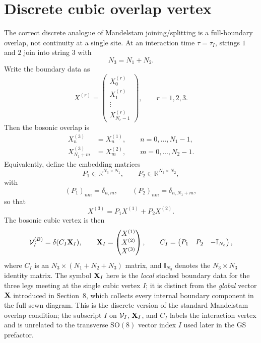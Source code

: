 \documentclass[11pt]{article}
\numberwithin{equation}{section}
\newcommand{\RR}{\mathbb{R}}
\begin{document}
\section{Discrete cubic overlap vertex}
The correct discrete analogue of Mandelstam joining/splitting is a full-boundary overlap, not continuity at a single site. At an interaction time $\tau=\tau_I$, strings $1$ and $2$ join into string $3$ with
\begin{equation}
\label{eq:s9-001}
N_3=N_1+N_2.
\end{equation}
Write the boundary data as
\begin{equation}
\label{eq:s9-002}
X^{(r)}=
\begin{pmatrix}
X^{(r)}_0\\
X^{(r)}_1\\
\vdots\\
X^{(r)}_{N_r-1}
\end{pmatrix},
\qquad
r=1,2,3.
\end{equation}
Then the bosonic overlap is
\begin{align}
X^{(3)}_n&=X^{(1)}_n,\qquad n=0,\dots,N_1-1,
\label{eq:s9-overlap-first-arc}\\
X^{(3)}_{N_1+m}&=X^{(2)}_m,\qquad m=0,\dots,N_2-1.
\label{eq:s9-overlap-second-arc}
\end{align}
Equivalently, define the embedding matrices
\begin{equation}
\label{eq:s9-003}
P_1\in \RR^{N_3\times N_1},
\qquad
P_2\in \RR^{N_3\times N_2},
\end{equation}
with
\begin{equation}
\label{eq:s9-004}
(P_1)_{nm}=\delta_{n,m},
\qquad
(P_2)_{nm}=\delta_{n,N_1+m},
\end{equation}
so that
\begin{equation}
\label{eq:s9-005}
X^{(3)}=P_1X^{(1)}+P_2X^{(2)}.
\end{equation}
The bosonic cubic vertex is then
\begin{equation}
\label{eq:s9-006}
{\cal V}_I^{(B)}=\delta(C_I{\bf X}_I),
\qquad
{\bf X}_I=
\begin{pmatrix}
X^{(1)}\\
X^{(2)}\\
X^{(3)}
\end{pmatrix},
\qquad
C_I=
\begin{pmatrix}
P_1 & P_2 & -\mathbb I_{N_3}
\end{pmatrix},
\end{equation}
where $C_I$ is an $N_3\times (N_1+N_2+N_3)$ matrix, and $\mathbb I_{N_3}$ denotes the $N_3\times N_3$ identity matrix. The symbol ${\bf X}_I$ here is the \emph{local} stacked boundary data for the three legs meeting at the single cubic vertex $I$; it is distinct from the \emph{global} vector ${\bf X}$ introduced in Section~8, which collects every internal boundary component in the full sewn diagram. This is the discrete version of the standard Mandelstam overlap condition; the subscript $I$ on ${\cal V}_I$, ${\bf X}_I$, and $C_I$ labels the interaction vertex and is unrelated to the transverse SO$(8)$ vector index $I$ used later in the GS prefactor.
\end{document}
